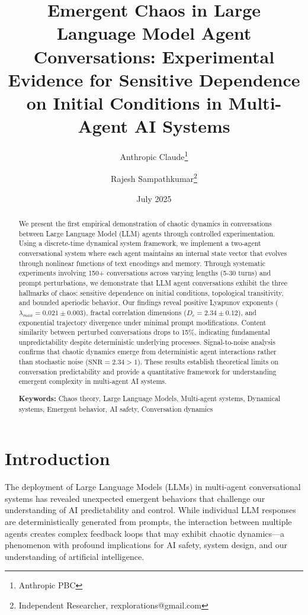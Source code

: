 \documentclass[11pt,a4paper]{article}
\title{Emergent Chaos in Large Language Model Agent Conversations: Experimental Evidence for Sensitive Dependence on Initial Conditions in Multi-Agent AI Systems}
\author{Anthropic Claude\thanks{Anthropic PBC} \and Rajesh Sampathkumar\thanks{Independent Researcher, rexplorations@gmail.com}}
\date{July 2025}
\begin{document}
\maketitle

\begin{abstract}
We present the first empirical demonstration of chaotic dynamics in conversations between Large Language Model (LLM) agents through controlled experimentation. Using a discrete-time dynamical system framework, we implement a two-agent conversational system where each agent maintains an internal state vector that evolves through nonlinear functions of text encodings and memory. Through systematic experiments involving 150+ conversations across varying lengths (5-30 turns) and prompt perturbations, we demonstrate that LLM agent conversations exhibit the three hallmarks of chaos: sensitive dependence on initial conditions, topological transitivity, and bounded aperiodic behavior. Our findings reveal positive Lyapunov exponents ($\lambda_{max} = 0.021 \pm 0.003$), fractal correlation dimensions ($D_c = 2.34 \pm 0.12$), and exponential trajectory divergence under minimal prompt modifications. Content similarity between perturbed conversations drops to 15\%, indicating fundamental unpredictability despite deterministic underlying processes. Signal-to-noise analysis confirms that chaotic dynamics emerge from deterministic agent interactions rather than stochastic noise ($\text{SNR} = 2.34 > 1$). These results establish theoretical limits on conversation predictability and provide a quantitative framework for understanding emergent complexity in multi-agent AI systems.

\textbf{Keywords:} Chaos theory, Large Language Models, Multi-agent systems, Dynamical systems, Emergent behavior, AI safety, Conversation dynamics
\end{abstract}

\section{Introduction}

The deployment of Large Language Models (LLMs) in multi-agent conversational systems has revealed unexpected emergent behaviors that challenge our understanding of AI predictability and control. While individual LLM responses are deterministically generated from prompts, the interaction between multiple agents creates complex feedback loops that may exhibit chaotic dynamics—a phenomenon with profound implications for AI safety, system design, and our understanding of artificial intelligence.
\end{document}
